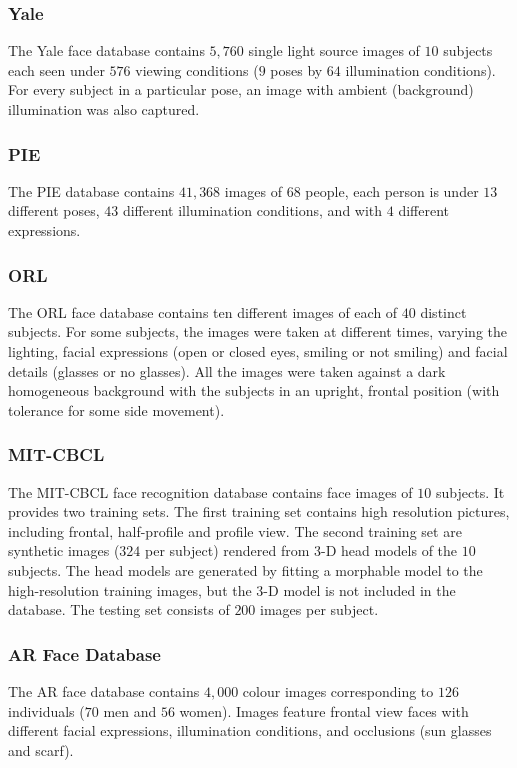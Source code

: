 \subsubsection{Yale}
The Yale face database \cite{Georghiades2001} contains $5,760$ single light source images of $10$ subjects each seen under $576$ viewing conditions ($9$ poses by $64$ illumination conditions). For every subject in a particular pose, an image with ambient (background) illumination was also captured.
\subsubsection{PIE}
The PIE database \cite{Sim2003} contains $41,368$ images of $68$ people, each person is under $13$ different poses, $43$ different illumination conditions, and with $4$ different expressions.
\subsubsection{ORL}
The ORL face database \cite{Samaria1994} contains ten different images of each of $40$ distinct subjects. For some subjects, the images were taken at different times, varying the lighting, facial expressions (open or closed eyes, smiling or not smiling) and facial details (glasses or no glasses). All the images were taken against a dark homogeneous background with the subjects in an upright, frontal position (with tolerance for some side movement).
\subsubsection{MIT-CBCL}
The MIT-CBCL face recognition database \cite{Weyrauch2004} contains face images of $10$ subjects. It provides two training sets. The first training set contains high resolution pictures, including frontal, half-profile and profile view. The second training set are synthetic images ($324$ per subject) rendered from 3-D head models of the $10$ subjects. The head models are generated by fitting a morphable model to the high-resolution training images, but the 3-D model is not included in the database. The testing set consists of $200$ images per subject. 
\subsubsection{AR Face Database}
The AR face database \cite{Martinez1998} contains $4,000$ colour images corresponding to $126$ individuals ($70$ men and $56$ women). Images feature frontal view faces with different facial expressions, illumination conditions, and occlusions (sun glasses and scarf).
